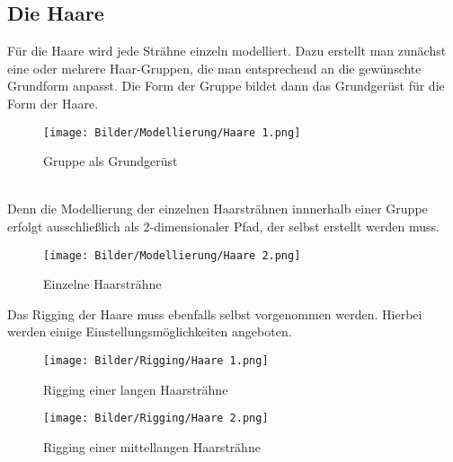 \documentclass[a4paper, 12pt]{article}
\begin{document}
\subsection{Die Haare}
\label{subsec:hair}
Für die Haare wird jede Strähne einzeln modelliert.
Dazu erstellt man zunächst eine oder mehrere Haar-Gruppen,
die man entsprechend an die gewünschte Grundform anpasst.
Die Form der Gruppe bildet dann das Grundgerüst für die Form der Haare.
\begin{figure}[htbp]
    \centering
    \texttt{[image: Bilder/Modellierung/Haare 1.png]}
    \caption{Gruppe als Grundgerüst}
\end{figure}
\\Denn die Modellierung der einzelnen Haarsträhnen innnerhalb einer Gruppe
erfolgt ausschließlich als 2-dimensionaler Pfad,
der selbst erstellt werden muss\cite{tut-hair}.
\begin{figure}[htbp]
    \centering
    \texttt{[image: Bilder/Modellierung/Haare 2.png]}
    \caption{Einzelne Haarsträhne}
\end{figure}
\newpage
Das Rigging der Haare muss ebenfalls selbst vorgenommen werden.
Hierbei werden einige Einstellungsmöglichkeiten angeboten.
\begin{figure}[htbp]
    \centering
    \texttt{[image: Bilder/Rigging/Haare 1.png]}
    \caption{Rigging einer langen Haarsträhne}
\end{figure}
\begin{figure}[htbp]
    \centering
    \texttt{[image: Bilder/Rigging/Haare 2.png]}
    \caption{Rigging einer mittellangen Haarsträhne}
\end{figure}
\newpage
\end{document}

